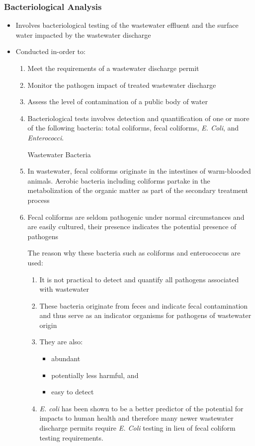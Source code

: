 \subsubsection{Bacteriological Analysis}
\begin{itemize}
	\item Involves bacteriological testing of the wastewater effluent and the surface water impacted by the wastewater discharge
	
	\item Conducted in-order to:
		\begin{enumerate}
			\item Meet the requirements of a wastewater discharge permit
			\item Monitor the pathogen impact of treated wastewater discharge
			\item Assess the level of contamination of a public body of water
			\item Bacteriological tests involves detection and quantification of one or more of the following bacteria:  total coliforms, fecal coliforms, \textit{E. Coli}, and \textit{Enterococci}. 
\begin{center}
Wastewater Bacteria
\end{center}
	
	\item  In wastewater, fecal coliforms originate in the intestines of warm-blooded animals.  Aerobic bacteria including coliforms partake in the metabolization of the organic matter as part of the secondary treatment process
\item Fecal coliforms are seldom pathogenic under normal circumstances and are easily cultured, their presence indicates the potential presence of pathogens

The reason why these bacteria such as coliforms and enterococcus are used:
		\begin{enumerate}
			\item It is not practical to detect and quantify all pathogens associated with wastewater
			\item These bacteria originate from feces and indicate fecal contamination and thus serve as an indicator organisms for pathogens of wastewater origin
			\item They are also:
				\begin{itemize}
					\item abundant
					\item potentially less harmful, and
					\item easy to detect
				\end{itemize}
			\item \textit{E. coli} has been shown to be a better predictor of the potential for impacts to human health and therefore many newer wastewater discharge permits require \textit{E. Coli} testing in lieu of fecal coliform testing requirements.
		\end{enumerate}
		\end{enumerate}

\end{itemize}

